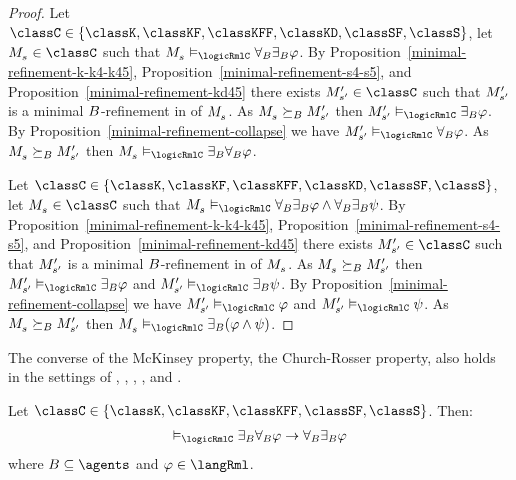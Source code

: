 \begin{proof}
Let $\classC \in \{\classK, \classKF, \classKFF, \classKD, \classSF, \classS\}$, let $\kPModel{\kStateS} \in \classC$ such that $\kPModel{\kStateS} \entails_\logicRmlC \allrefsBs \somerefsBs \phi$.
By Proposition~\ref{minimal-refinement-k-k4-k45}, Proposition~\ref{minimal-refinement-s4-s5}, and Proposition~\ref{minimal-refinement-kd45} there exists $\kPModelP{\kStateSP} \in \classC$ such that ${M^{\prime}_{{s}^{\prime}}}$ is a minimal $B$-refinement in \classC{} of $\kPModel{\kStateS}$.
As $\kPModel{\kStateS} \simulatesBs \kPModelP{\kStateSP}$ then $\kPModelP{\kStateSP} \entails_\logicRmlC \somerefsBs \phi$.
By Proposition~\ref{minimal-refinement-collapse} we have $\kPModelP{\kStateSP} \entails_\logicRmlC \allrefsBs \phi$.
As $\kPModel{\kStateS} \simulatesBs \kPModelP{\kStateSP}$ then $\kPModel{\kStateS} \entails_\logicRmlC \somerefsBs \allrefsBs \phi$.

Let $\classC \in \{\classK, \classKF, \classKFF, \classKD, \classSF, \classS\}$, let $\kPModel{\kStateS} \in \classC$ such that $\kPModel{\kStateS} \entails_\logicRmlC \allrefsBs \somerefsBs \phi \land \allrefsBs \somerefsBs \psi$.
By Proposition~\ref{minimal-refinement-k-k4-k45}, Proposition~\ref{minimal-refinement-s4-s5}, and Proposition~\ref{minimal-refinement-kd45} there exists $\kPModelP{\kStateSP} \in \classC$ such that ${M^{\prime}_{{s}^{\prime}}}$ is a minimal $B$-refinement in \classC{} of $\kPModel{\kStateS}$.
As $\kPModel{\kStateS} \simulatesBs \kPModelP{\kStateSP}$ then $\kPModelP{\kStateSP} \entails_\logicRmlC \somerefsBs \phi$ and $\kPModelP{\kStateSP} \entails_\logicRmlC \somerefsBs \psi$.
By Proposition~\ref{minimal-refinement-collapse} we have $\kPModelP{\kStateSP} \entails_\logicRmlC \phi$ and $\kPModelP{\kStateSP} \entails_\logicRmlC \psi$.
As $\kPModel{\kStateS} \simulatesBs \kPModelP{\kStateSP}$ then $\kPModel{\kStateS} \entails_\logicRmlC \somerefsBs (\phi \land \psi)$.
\end{proof}

The converse of the McKinsey property, the Church-Rosser property, also holds in the settings of \classK{}, \classKF{}, \classKFF{}, \classSF{}, and \classS{}.

\begin{proposition}\label{rml-church-rosser}
Let $\classC \in \{\classK, \classKF, \classKFF, \classSF, \classS\}$. Then:
$$
\begin{array}{l}
    \entails_\logicRmlC \somerefsBs \allrefsBs \phi \implies \allrefsBs \somerefsBs \phi
\end{array}
$$
where $\agentsB \subseteq \agents$ and $\phi \in \langRml$.
\end{proposition}

